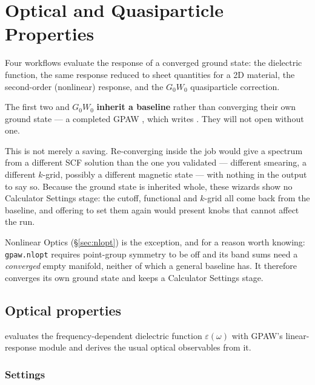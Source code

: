 \chapter{Optical and Quasiparticle Properties}
\label{ch:optics-gw}

Four workflows evaluate the response of a converged ground state: the
dielectric function, the same response reduced to sheet quantities for a 2D
material, the second-order (nonlinear) response, and the $G_0W_0$ quasiparticle
correction.

\begin{calwarn}
The first two and $G_0W_0$ \textbf{inherit a baseline} rather than converging
their own ground state --- a completed GPAW
\menusep{}, which writes
. They will not open without one.

This is not merely a saving. Re-converging inside the job would give a spectrum
from a different SCF solution than the one you validated --- different
smearing, a different $k$-grid, possibly a different magnetic state --- with
nothing in the output to say so. Because the ground state is inherited whole,
these wizards show no Calculator Settings stage: the cutoff, functional and
$k$-grid all come back from the baseline, and offering to set them again would
present knobs that cannot affect the run.

Nonlinear Optics (\S\ref{sec:nlopt}) is the exception, and for a reason worth
knowing: \texttt{gpaw.nlopt} requires point-group symmetry to be off and its
band sums need a \emph{converged} empty manifold, neither of which a general
baseline has. It therefore converges its own ground state and keeps a
Calculator Settings stage.
\end{calwarn}

\section{Optical properties}
\label{sec:optics}

\menusep{} evaluates the frequency-dependent
dielectric function $\varepsilon(\omega)$ with GPAW's linear-response module
and derives the usual optical observables from it.

\subsection{Settings}

